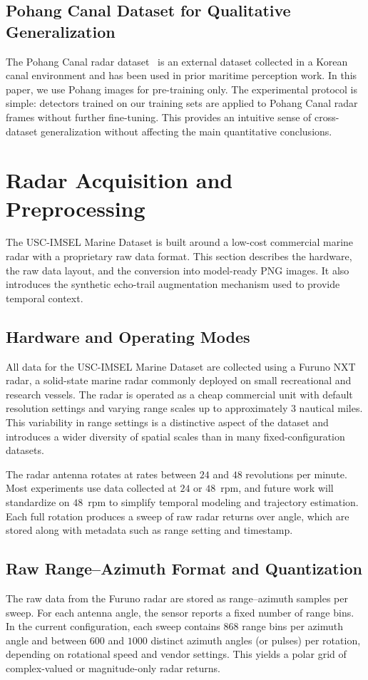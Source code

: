 \documentclass[conference]{IEEEtran}
\begin{document}
\subsection{Pohang Canal Dataset for Qualitative Generalization}
The Pohang Canal radar dataset~\cite{chung2023pohang_canal_dataset} is an external dataset collected in a Korean canal environment and has been used in prior maritime perception work. In this paper, we use Pohang images for pre-training only. The experimental protocol is simple: detectors trained on our training sets are applied to Pohang Canal radar frames without further fine-tuning. This provides an intuitive sense of cross-dataset generalization without affecting the main quantitative conclusions.


\section{Radar Acquisition and Preprocessing}
\label{sec:acq}
The USC-IMSEL Marine Dataset is built around a low-cost commercial marine radar with a proprietary raw data format. This section describes the hardware, the raw data layout, and the conversion into model-ready PNG images. It also introduces the synthetic echo-trail augmentation mechanism used to provide temporal context.

\subsection{Hardware and Operating Modes}
All data for the USC-IMSEL Marine Dataset are collected using a Furuno NXT radar, a solid-state marine radar commonly deployed on small recreational and research vessels. The radar is operated as a cheap commercial unit with default resolution settings and varying range scales up to approximately $3$ nautical miles. This variability in range settings is a distinctive aspect of the dataset and introduces a wider diversity of spatial scales than in many fixed-configuration datasets.

The radar antenna rotates at rates between $24$ and $48$ revolutions per minute. Most experiments use data collected at $24$ or $48$~rpm, and future work will standardize on $48$~rpm to simplify temporal modeling and trajectory estimation. Each full rotation produces a sweep of raw radar returns over angle, which are stored along with metadata such as range setting and timestamp.

\subsection{Raw Range--Azimuth Format and Quantization}
The raw data from the Furuno radar are stored as range--azimuth samples per sweep. For each antenna angle, the sensor reports a fixed number of range bins. In the current configuration, each sweep contains $868$ range bins per azimuth angle and between $600$ and $1000$ distinct azimuth angles (or pulses) per rotation, depending on rotational speed and vendor settings. This yields a polar grid of complex-valued or magnitude-only radar returns.
\end{document}
